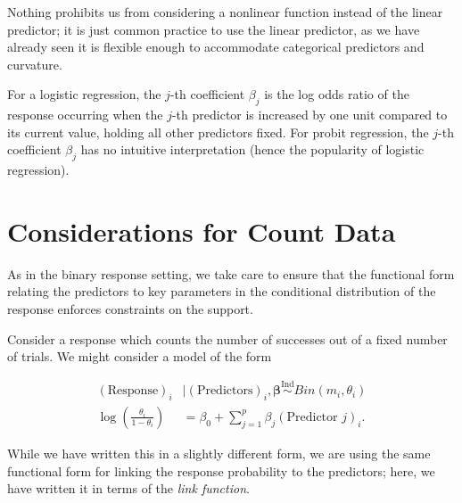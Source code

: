 \documentclass[
  letterpaper,
  DIV=11,
  numbers=noendperiod]{scrreprt}
\theoremstyle{definition}
\theoremstyle{definition}
\theoremstyle{plain}
\theoremstyle{remark}
\begin{document}
Nothing prohibits us from considering a nonlinear function instead of
the linear predictor; it is just common practice to use the linear
predictor, as we have already seen it is flexible enough to accommodate
categorical predictors and curvature.

For a logistic regression, the \(j\)-th coefficient \(\beta_j\) is the
log odds ratio of the response occurring when the \(j\)-th predictor is
increased by one unit compared to its current value, holding all other
predictors fixed. For probit regression, the \(j\)-th coefficient
\(\beta_j\) has no intuitive interpretation (hence the popularity of
logistic regression).

\hypertarget{considerations-for-count-data}{%
\section{Considerations for Count
Data}\label{considerations-for-count-data}}

As in the binary response setting, we take care to ensure that the
functional form relating the predictors to key parameters in the
conditional distribution of the response enforces constraints on the
support.

Consider a response which counts the number of successes out of a fixed
number of trials. We might consider a model of the form

\[
\begin{aligned}
  (\text{Response})_i &\mid (\text{Predictors})_i, \boldsymbol{\beta} \stackrel{\text{Ind}}{\sim}Bin\left(m_i, \theta_i\right) \\
\log\left(\frac{\theta_i}{1-\theta_i}\right) &= \beta_0 + \sum_{j=1}^{p} \beta_j (\text{Predictor } j)_i.
\end{aligned}
\]

While we have written this in a slightly different form, we are using
the same functional form for linking the response probability to the
predictors; here, we have written it in terms of the \emph{link
function}.
\end{document}
